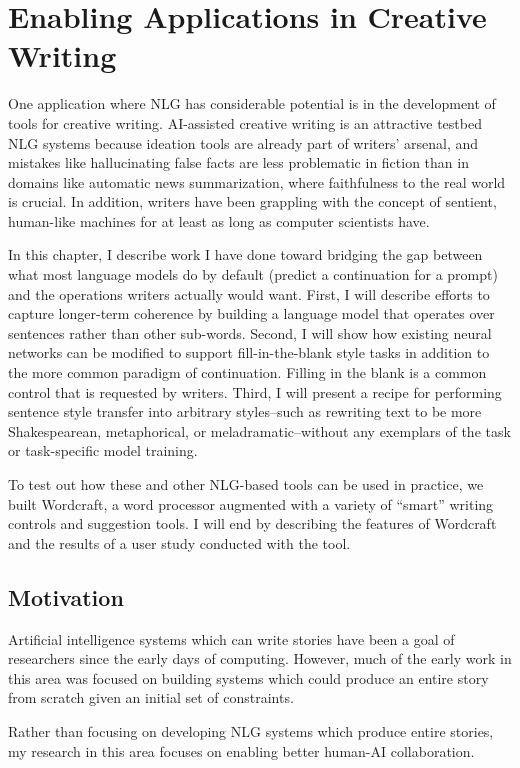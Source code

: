 \chapter{Enabling Applications in Creative Writing}
\label{chap:creativity}
One application where NLG has considerable potential is in the development of tools for creative writing. AI-assisted creative writing is an attractive testbed NLG systems because ideation tools are already part of writers' arsenal, and mistakes like hallucinating false facts are less problematic in fiction than in domains like automatic news summarization, where faithfulness to the real world is crucial. In addition, writers have been grappling with the concept of sentient, human-like machines for at least as long as computer scientists have.

In this chapter, I describe work I have done toward bridging the gap between what most language models do by default (predict a continuation for a prompt) and the operations writers actually would want.
First, I will describe efforts to capture longer-term coherence by building a language model that operates over sentences rather than other sub-words.
Second, I will show how existing neural networks can be modified to support fill-in-the-blank style tasks in addition to the more common paradigm of continuation.
Filling in the blank is a common control that is requested by writers.
Third, I will present a recipe for performing sentence style transfer into arbitrary styles--such as rewriting text to be more Shakespearean, metaphorical, or meladramatic--without any exemplars of the task or task-specific model training.

To test out how these and other NLG-based tools can be used in practice, we built Wordcraft, a word processor augmented with a variety of ``smart'' writing controls and suggestion tools.
I will end by describing the features of Wordcraft and the results of a user study conducted with the tool.

\section{Motivation}
Artificial intelligence systems which can write stories have been a goal of researchers since the early days of computing.
However, much of the early work in this area was focused on building systems which could produce an entire story from scratch given an initial set of constraints.

Rather than focusing on developing NLG systems which produce entire stories, my research in this area focuses on enabling better human-AI collaboration.

